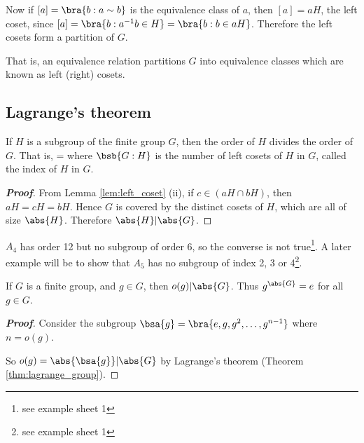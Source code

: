 \begin{remark}
Now if $[a] = \bra{b:a\sim b}$ is the equivalence class of $a$, then $[a] = aH$, the left coset, since $[a] = \bra{b:a^{-1}b\in H} = \bra{b:b\in aH}$. Therefore the left cosets form a partition of $G$.

That is, an equivalence relation partitions $G$ into equivalence classes which are known as left (right) cosets.
\end{remark}

\subsection{Lagrange's theorem}

\begin{theorem}\label{thm:lagrange_group}
If $H$ is a subgroup of the finite group $G$, then the order of $H$ divides the order of $G$. That is,
\be
{} = 
\ee
where $\bsb{G:H}$ is the number of left cosets of $H$ in $G$, called the index of $H$ in $G$.
\end{theorem}

\begin{proof}[\bf Proof]
From Lemma \ref{lem:left_coset} (ii), if $c \in (aH \cap bH)$, then $aH = cH = bH$. Hence $G$ is covered by the distinct cosets of $H$, which are all of size $\abs{H}$. Therefore $\abs{H}|\abs{G}$.
\end{proof}

\begin{remark}
$A_4$ has order 12 but no subgroup of order 6, so the converse is not true\footnote{see example sheet 1}. A later example will be to show that $A_5$ has no subgroup of index 2, 3 or 4\footnote{see example sheet 1}.
\end{remark}



\begin{corollary}\label{cor:lagrange_group}
If $G$ is a finite group, and $g\in G$, then $o(g)|\abs{G}$. Thus $g^{\abs{G}} =e$ for all $g\in G$.
\end{corollary}

\begin{proof}[\bf Proof]
Consider the subgroup $\bsa{g} = \bra{e,g,g^2,\dots,g^{n-1}}$ where $n=o(g)$.

So $o(g) = \abs{\bsa{g}}|\abs{G}$ by Lagrange's theorem (Theorem \ref{thm:lagrange_group}).
\end{proof}




